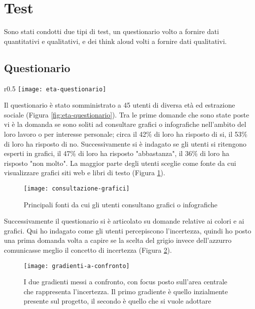 \section{Test}
Sono stati condotti due tipi di test, un questionario volto a fornire dati quantitativi e qualitativi, e dei think aloud volti a fornire dati qualitativi. \\

\subsection{Questionario}
\begin{wrapfigure}{r}{0.5\textwidth}
    \centering
    \texttt{[image: eta-questionario]}
    \caption{Età degli utenti che hanno risposto al questionario}
    \label{fig:eta-questionario}
\end{wrapfigure}

Il questionario è stato somministrato a 45 utenti di diversa età ed estrazione sociale (Figura \ref{fig:eta-questionario}). Tra le prime domande che sono state poste vi è la domanda se sono soliti ad consultare grafici o infografiche nell'ambito del loro lavoro o per interesse personale; circa il 42\% di loro ha risposto di si, il 53\% di loro ha risposto di no. Successivamente si è indagato se gli utenti si ritengono esperti in grafici, il 47\% di loro ha risposto "abbastanza", il 36\% di loro ha risposto "non molto". La maggior parte degli utenti sceglie come fonte da cui visualizzare grafici siti web e libri di testo (Figura \ref{fig:consultazione-grafici}).\\

\begin{figure}[!ht] 
    \centering 
    \texttt{[image: consultazione-grafici]} 
    \caption{Principali fonti da cui gli utenti consultano grafici o infografiche}
    \label{fig:consultazione-grafici}
\end{figure}

Successivamente il questionario si è articolato su domande relative ai colori e ai grafici. Qui ho indagato come gli utenti percepiscono l'incertezza, quindi ho posto una prima domanda volta a capire se la scelta del grigio invece dell'azzurro comunicasse meglio il concetto di incertezza (Figura \ref{fig:gradienti-a-confronto}). 

\begin{figure}[!ht] 
    \centering 
    \texttt{[image: gradienti-a-confronto]} 
    \caption{I due gradienti messi a confronto, con focus posto sull'area centrale che rappresenta l'incertezza. Il primo gradiente è quello inzialmente presente sul progetto, il secondo è quello che si vuole adottare}
    \label{fig:gradienti-a-confronto}
\end{figure}

